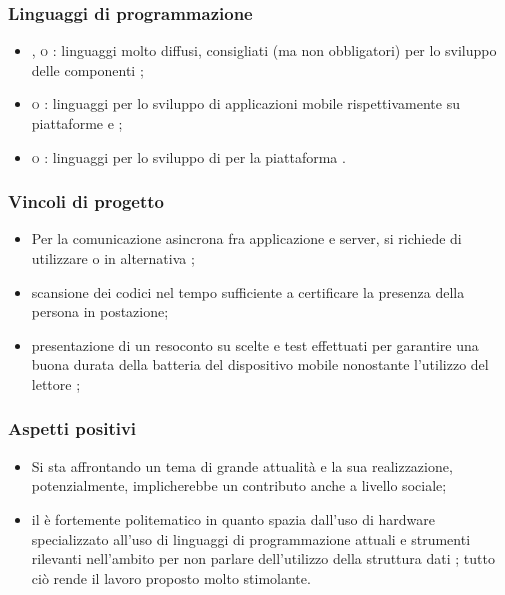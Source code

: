 \documentclass[]{article}
\begin{document}
			\subsubsection{Linguaggi di programmazione}
			\begin{itemize}
				\item \textsc{,  o :} linguaggi molto diffusi, consigliati (ma non obbligatori) per lo sviluppo delle componenti ;
				\item \textsc{ o :} linguaggi per lo sviluppo di applicazioni mobile rispettivamente su piattaforme  e ;
				\item \textsc{ o :} linguaggi per lo sviluppo di  per la piattaforma .
			\end{itemize}

			\subsubsection{Vincoli di progetto}
			\begin{itemize}
				\item Per la comunicazione asincrona fra applicazione e server, si richiede di utilizzare  o in alternativa ;
				\item scansione dei codici nel tempo sufficiente a certificare la presenza della persona in postazione;
				\item presentazione di un resoconto su scelte e test effettuati per garantire una buona durata della batteria del dispositivo mobile nonostante l'utilizzo del lettore ;
			\end{itemize}

			\subsubsection{Aspetti positivi}
			\begin{itemize}
				\item Si sta affrontando un tema di grande attualità e la sua realizzazione, potenzialmente, implicherebbe un contributo anche a livello sociale;
				\item il  è fortemente politematico in quanto spazia dall'uso di hardware specializzato all'uso di linguaggi di programmazione attuali e strumenti rilevanti nell'ambito  per non parlare dell'utilizzo della struttura dati ; tutto ciò rende il lavoro proposto molto stimolante.
			\end{itemize}
\end{document}
